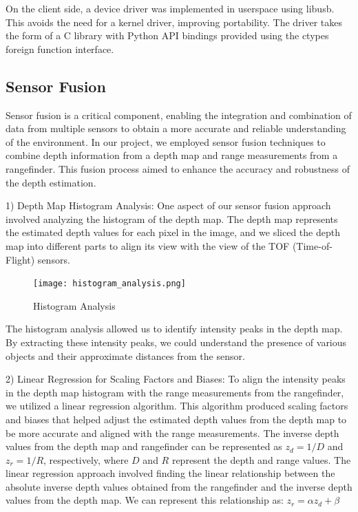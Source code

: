 \documentclass[conference]{IEEEtran}
\begin{document}
\FloatBarrier

On the client side, a device driver was implemented in userspace using
libusb. This avoids the need for a kernel driver, improving portability. The
driver takes the form of a C library with Python API bindings provided using
the ctypes foreign function interface.

\subsection{Sensor Fusion}
Sensor fusion is a critical component, enabling the integration and combination of data from multiple sensors to obtain a more accurate and reliable understanding of the environment. In our project, we employed sensor fusion techniques to combine depth information from a depth map and range measurements from a rangefinder. This fusion process aimed to enhance the accuracy and robustness of the depth estimation.

1) Depth Map Histogram Analysis:
One aspect of our sensor fusion approach involved analyzing the histogram of the depth map. The depth map represents the estimated depth values for each pixel in the image, and we sliced the depth map into different parts to align its view with the view of the TOF (Time-of-Flight) sensors. 


\begin{figure}[htbp]
    \centering
    \texttt{[image: histogram\_analysis.png]}
    \caption{Histogram Analysis}
    \label{fig:Histogram Analysis}
\end{figure}

The histogram analysis allowed us to identify intensity peaks in the depth map. By extracting these intensity peaks, we could understand the presence of various objects and their approximate distances from the sensor.


2) Linear Regression for Scaling Factors and Biases:
To align the intensity peaks in the depth map histogram with the range measurements from the rangefinder, we utilized a linear regression algorithm. This algorithm produced scaling factors and biases that helped adjust the estimated depth values from the depth map to be more accurate and aligned with the range measurements.
The inverse depth values from the depth map and rangefinder can be represented as $z_{d} = 1/D$ and $z_{r} = 1/R$, respectively, where $D$ and $R$ represent the depth and range values. The linear regression approach involved finding the linear relationship between the absolute inverse depth values obtained from the rangefinder and the inverse depth values from the depth map. We can represent this relationship as:
$z_r=\alpha z_d+\beta$
\end{document}
